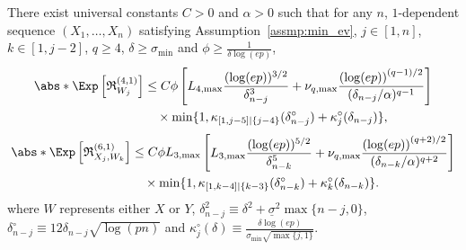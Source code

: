 \documentclass[aos]{imsart}
\begin{document}
\begin{appendix}
\begin{lemma} \label{thm:remainder_lemma_4N}
    There exist universal constants $C > 0$ and $\alpha > 0$ such that for any $n$, $1$-dependent sequence $(X_1, \dots, X_n)$ satisfying Assumption~\eqref{assmp:min_ev}, $j \in [1,n]$, $k \in [1,j-2]$, $q \geq 4$, $\delta \geq \sigma_{\min}$ and $\phi \geq \frac{1}{\delta \log(ep)}$,
    \begin{equation*}
    \begin{aligned}
        \abs*{\Exp \left[ \mathfrak{R}_{W_j}^{(4,1)} \right]} 
        & \leq C \phi \left[ 
            {L}_{4,\max} \frac{(\log(ep))^{3/2}}{\delta_{n-j}^3}
            + \nu_{q,\max} \frac{ {(\log(ep))}^{(q-1)/2}}{(\delta_{n-j}/\alpha)^{q-1}}
        \right] \\
        & \quad \times \min\{ 1, \kappa_{[1,j-5]|\{j-4\}}(\delta_{n-j}^\circ) + \kappa^\circ_{j}(\delta_{n-j}) \},
    \end{aligned}
    \end{equation*}
    \begin{equation*}
    \begin{aligned}
        \abs*{\Exp \left[ \mathfrak{R}_{X_j,W_k}^{(6,1)} \right]} 
        & \leq C \phi L_{3,\max} \left[ \begin{aligned}
            L_{3,\max} \frac{(\log(ep))^{5/2}}{\delta_{n-k}^5}
            + \nu_{q,\max} \frac{ {(\log(ep))}^{(q+2)/2}}{(\delta_{n-k}/\alpha)^{q+2}}
        \end{aligned} \right] \\
        & \quad \times \min\{ 1, \kappa_{[1,k-4]|\{k-3\}}(\delta_{n-k}^\circ) + \kappa^\circ_{k}(\delta_{n-k}) \}.
    \end{aligned}
    \end{equation*}
    where $W$ represents either $X$ or $Y$, $\delta_{n-j}^2 \equiv \delta^2 + \underline{\sigma}^2 \max\{n-j,0\}$, $\delta^\circ_{n-j} \equiv 12 \delta_{n-j} \sqrt{\log(pn)}$ and $\kappa^\circ_{j}(\delta) \equiv \frac{\delta \log(ep)}{\sigma_{\min} \sqrt{\max\{j, 1\}}}$.
\end{lemma}


\end{appendix}
\end{document}

